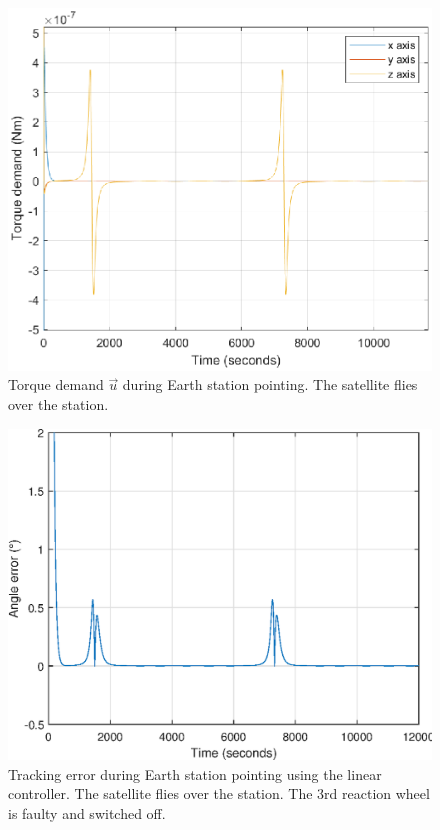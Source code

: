 \begin{figure}[H]
	\centering
	\includegraphics[width=0.7\linewidth]{figures/torque_stationTrack}
	\caption{Torque demand $\vec{u}$ during Earth station pointing. The satellite flies over the station.}
	\label{fig:torque_stationTrack}
\end{figure}

\begin{figure}[H]
	\centering
	\includegraphics[width=0.7\linewidth]{figures/faultyangerror}
	\caption{Tracking error during Earth station pointing using the linear controller. The satellite flies over the station. The 3rd reaction wheel is faulty and switched off.}
	\label{fig:angle_error2}
\end{figure}


